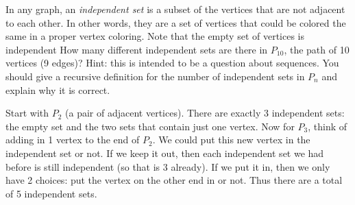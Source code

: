 \documentclass[10pt]{exam}
\begin{document}
\begin{questions}





\question[5] In any graph, an \emph{independent set} is a subset of the vertices that are not adjacent to each other.  In other words, they are a set of vertices that could be colored the same in a proper vertex coloring.  Note that the empty set of vertices is independent  How many different independent sets are there in $P_{10}$, the path of 10 vertices (9 edges)?  Hint: this is intended to be a question about sequences.  You should give a recursive definition for the number of independent sets in $P_n$ and explain why it is correct.

\begin{solution}
Start with $P_2$ (a pair of adjacent vertices).  There are exactly 3 independent sets: the empty set and the two sets that contain just one vertex.  Now for $P_3$, think of adding in 1 vertex to the end of $P_2$.  We could put this new vertex in the independent set or not.  If we keep it out, then each independent set we had before is still independent (so that is 3 already).  If we put it in, then we only have 2 choices: put the vertex on the other end in or not.  Thus there are a total of 5 independent sets.


\end{solution}
\end{questions}
\end{document}

